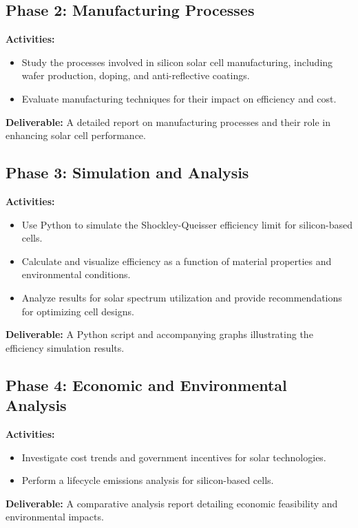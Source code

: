 \documentclass[11pt]{article}
\begin{document}
\subsection*{Phase 2: Manufacturing Processes}
\textbf{Activities:}
\begin{itemize}
    \item Study the processes involved in silicon solar cell manufacturing, including wafer production, doping, and anti-reflective coatings.
    \item Evaluate manufacturing techniques for their impact on efficiency and cost.
\end{itemize}
\textbf{Deliverable:} A detailed report on manufacturing processes and their role in enhancing solar cell performance.

\subsection*{Phase 3: Simulation and Analysis}
\textbf{Activities:}
\begin{itemize}
    \item Use Python to simulate the Shockley-Queisser efficiency limit for silicon-based cells.
    \item Calculate and visualize efficiency as a function of material properties and environmental conditions.
    \item Analyze results for solar spectrum utilization and provide recommendations for optimizing cell designs.
\end{itemize}
\textbf{Deliverable:} A Python script and accompanying graphs illustrating the efficiency simulation results.

\subsection*{Phase 4: Economic and Environmental Analysis}
\textbf{Activities:}
\begin{itemize}
    \item Investigate cost trends and government incentives for solar technologies.
    \item Perform a lifecycle emissions analysis for silicon-based cells.
\end{itemize}
\textbf{Deliverable:} A comparative analysis report detailing economic feasibility and environmental impacts.
\end{document}
